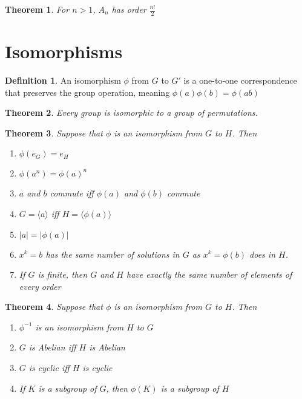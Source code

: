 \documentclass{article}
\newtheorem{theorem}{Theorem}[section]
\theoremstyle{definition}
\newtheorem*{definition}{Definition}
\begin{document}
\begin{theorem}
    For $n > 1$, $A_n$ has order $\frac{n!}{2}$
\end{theorem}

\section{Isomorphisms}

\begin{definition}
    An isomorphism $\phi$ from $G$ to $G'$ is a one-to-one correspondence that preserves the group operation, meaning $\phi(a)\phi(b) = \phi(ab)$
\end{definition}

\begin{theorem}
    Every group is isomorphic to a group of permutations.
\end{theorem}

\begin{theorem}
    Suppose that $\phi$ is an isomorphism from $G$ to $H$. Then 
    \begin{enumerate}
        \item $\phi(e_G) = e_H$
        \item $\phi(a^n) = \phi(a)^n$
        \item $a$ and $b$ commute iff $\phi(a)$ and $\phi(b)$ commute
        \item $G = \langle a \rangle$ iff $H = \langle \phi(a) \rangle$
        \item $|a| = |\phi(a)|$
        \item $x^k = b$ has the same number of solutions in $G$ as $x^k = \phi(b)$ does in $H$. 
        \item If $G$ is finite, then $G$ and $H$ have exactly the same number of elements of every order
    \end{enumerate}
\end{theorem}

\begin{theorem}
    Suppose that $\phi$ is an isomorphism from $G$ to $H$. Then 
    \begin{enumerate}
        \item $\phi^{-1}$ is an isomorphism from $H$ to $G$
        \item $G$ is Abelian iff $H$ is Abelian
        \item $G$ is cyclic iff $H$ is cyclic
        \item If $K$ is a subgroup of $G$, then $\phi(K)$ is a subgroup of $H$
    \end{enumerate}
\end{theorem}
\end{document}
